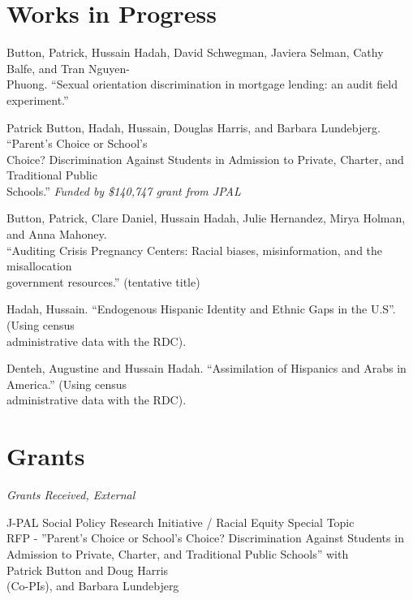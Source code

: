 \documentclass[letterpaper]{article}
\renewenvironment{itemize}{
  \begin{list}{}{
    \setlength{\leftmargin}{1.5em}
  }
}{
  \end{list}
}
\begin{document}
\section*{Works in Progress}
\vspace{2 mm}
\begin{itemize}
\item Button, Patrick, Hussain Hadah, David Schwegman, Javiera Selman, Cathy Balfe\student, and Tran Nguyen-\\{\makebox[4mm]{\hfill}}Phuong\student. ``Sexual orientation discrimination in mortgage lending: an audit field experiment.''

\item Patrick Button, Hadah, Hussain, Douglas Harris, and Barbara Lundebjerg\student. ``Parent’s Choice or School’s \\{\makebox[4mm]{\hfill}} Choice?
Discrimination Against Students in Admission to Private, Charter, and Traditional Public \\{\makebox[4mm]{\hfill}} Schools.'' \textit{Funded by \$140,747 grant from JPAL}

\item Button, Patrick, Clare Daniel, Hussain Hadah, 
Julie Hernandez, Mirya Holman, and Anna Mahoney. 
\\{\makebox[4mm]{\hfill}}``Auditing Crisis
 Pregnancy Centers: Racial biases, misinformation, 
and the misallocation \\{\makebox[4mm]{\hfill}}government resources.'' (tentative title)

\item Hadah, Hussain. ``Endogenous Hispanic Identity and Ethnic Gaps in the U.S''. (Using census \\{\makebox[4mm]{\hfill}} administrative data with the RDC).
\item Denteh, Augustine and Hussain Hadah. ``Assimilation of Hispanics and Arabs in America.'' (Using census \\{\makebox[4mm]{\hfill}} administrative data with the RDC).


\end{itemize}


\section*{Grants}

\vspace{2 mm}
\textit{Grants Received, External} \\
\begin{itemize}
  \item {} {}J-PAL Social Policy Research Initiative / Racial Equity Special Topic \\{\makebox[17mm]{\hfill}} RFP - ”Parent’s Choice or School’s Choice? Discrimination Against Students in \\{\makebox[17mm]{\hfill}} Admission to Private, Charter, and Traditional Public Schools” with \\{\makebox[17mm]{\hfill}} Patrick Button and Doug Harris \\{\makebox[17mm]{\hfill}} (Co-PIs), and Barbara Lundebjerg\student
\end{itemize}
\end{document}
